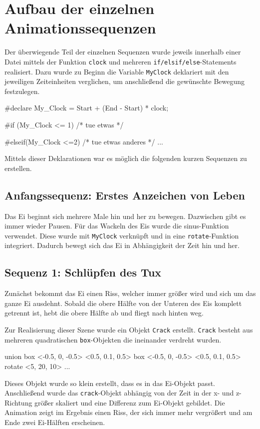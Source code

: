 \documentclass[11pt,parskip]{scrartcl}
\begin{document}
\newpage


\section{Aufbau der einzelnen Animationssequenzen}
Der überwiegende Teil der einzelnen Sequenzen wurde jeweils innerhalb einer
Datei mittels der Funktion \texttt{clock} und mehreren
\texttt{if/elsif/else}-Statements realisiert. Dazu wurde zu Beginn die Variable
\texttt{MyClock} deklariert mit den jeweiligen Zeiteinheiten verglichen, um
anschließend die gewünschte Bewegung festzulegen.
%
\begin{tcblisting}{}
  #declare My_Clock = Start + (End - Start) * clock;

  #if (My_Clock <= 1)
  /* tue etwas */

  #elseif(My_Clock <=2)
  /* tue etwas anderes */
  ...
\end{tcblisting}
%
Mittels dieser Deklarationen war es möglich die folgenden kurzen Sequenzen zu
erstellen.

\subsection{Anfangssequenz: Erstes Anzeichen von Leben}
Das Ei beginnt sich mehrere Male hin und her zu bewegen. Dazwischen gibt es
immer wieder Pausen. Für das Wackeln des Eis wurde die sinus-Funktion verwendet.
Diese wurde mit \texttt{MyClock} verknüpft und in eine \texttt{rotate}-Funktion
integriert. Dadurch bewegt sich das Ei in Abhängigkeit der Zeit hin und her.

\subsection{Sequenz 1: Schlüpfen des Tux}
Zunächst bekommt das Ei einen Riss, welcher immer größer wird und sich um das
ganze Ei ausdehnt. Sobald die obere Hälfte von der Unteren des Eis komplett
getrennt ist, hebt die obere Hälfte ab und fliegt nach hinten weg.

Zur Realisierung dieser Szene wurde ein Objekt \texttt{Crack} erstellt.
\texttt{Crack} besteht aus mehreren quadratischen \texttt{box}-Objekten die
ineinander verdreht wurden.
%
\begin{tcblisting}{}
  union{
    box{
      <-0.5, 0, -0.5>
      <0.5, 0.1, 0.5>
    }
    box{
      <-0.5, 0, -0.5>
      <0.5, 0.1, 0.5>
      rotate <5, 20, 10>
    }
    ...
  }
\end{tcblisting}
%
Dieses Objekt wurde so klein erstellt, dass es in das Ei-Objekt passt.
Anschließend wurde das \texttt{crack}-Objekt abhängig von der Zeit in der x- und
z-Richtung größer skaliert und eine Differenz zum Ei-Objekt gebildet. Die
Animation zeigt im Ergebnis einen Riss, der sich immer mehr vergrößert und am
Ende zwei Ei-Hälften erscheinen.
\end{document}
